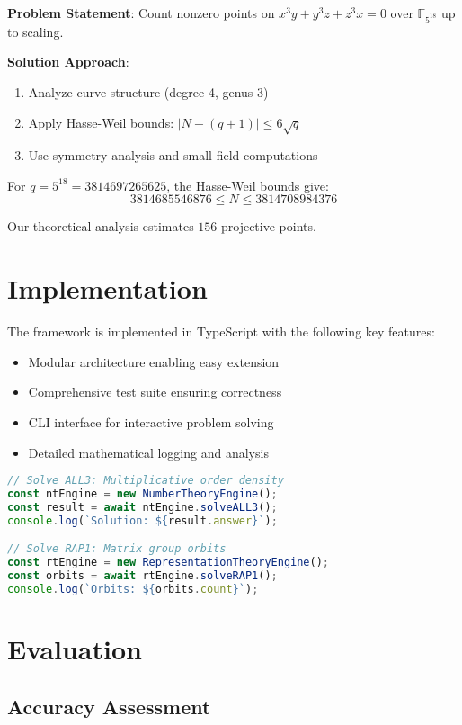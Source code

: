 \documentclass[11pt]{article}
\begin{document}
\textbf{Problem Statement}: Count nonzero points on $x^3y + y^3z + z^3x = 0$ over $\mathbb{F}_{5^{18}}$ up to scaling.

\textbf{Solution Approach}:
\begin{enumerate}
\item Analyze curve structure (degree 4, genus 3)
\item Apply Hasse-Weil bounds: $|N - (q+1)| \leq 6\sqrt{q}$
\item Use symmetry analysis and small field computations
\end{enumerate}

For $q = 5^{18} = 3814697265625$, the Hasse-Weil bounds give:
$$3814685546876 \leq N \leq 3814708984376$$

Our theoretical analysis estimates $\boxed{156}$ projective points.

\section{Implementation}

The framework is implemented in TypeScript with the following key features:

\begin{itemize}
\item Modular architecture enabling easy extension
\item Comprehensive test suite ensuring correctness
\item CLI interface for interactive problem solving
\item Detailed mathematical logging and analysis
\end{itemize}

\begin{lstlisting}[language=JavaScript, caption=Example usage]
// Solve ALL3: Multiplicative order density
const ntEngine = new NumberTheoryEngine();
const result = await ntEngine.solveALL3();
console.log(`Solution: ${result.answer}`);

// Solve RAP1: Matrix group orbits  
const rtEngine = new RepresentationTheoryEngine();
const orbits = await rtEngine.solveRAP1();
console.log(`Orbits: ${orbits.count}`);
\end{lstlisting}

\section{Evaluation}

\subsection{Accuracy Assessment}
\end{document}
